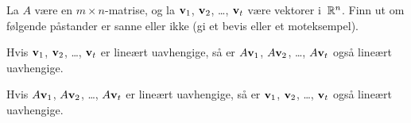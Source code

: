 






\begin{oppgave}
La $A$ være en $m \times n$-matrise, og la $\mathbf{v}_1$, $\mathbf{v}_2$,
\ldots, $\mathbf{v}_t$ være vektorer i~$\mathbb{R}^n$.  Finn ut om følgende
påstander er sanne eller ikke (gi et bevis eller et moteksempel).
\begin{punkt}
Hvis $\mathbf{v}_1$, $\mathbf{v}_2$, \ldots, $\mathbf{v}_t$ er lineært uavhengige, så
er $A \mathbf{v}_1$, $A \mathbf{v}_2$, \ldots, $A \mathbf{v}_t$ også lineært
uavhengige.
\end{punkt}
\begin{punkt}
Hvis $A \mathbf{v}_1$, $A \mathbf{v}_2$, \ldots, $A \mathbf{v}_t$ er lineært
uavhengige, så er $\mathbf{v}_1$, $\mathbf{v}_2$, \ldots, $\mathbf{v}_t$ også lineært
uavhengige.
\end{punkt}
\end{oppgave}

